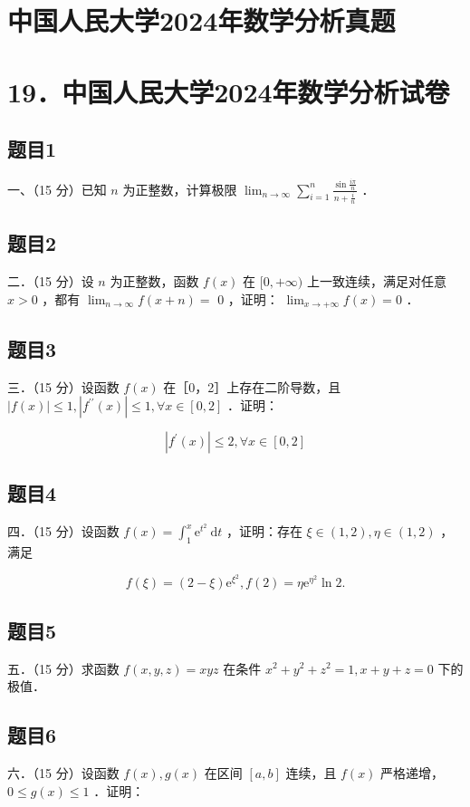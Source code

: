 \documentclass{article}
\begin{document}
\section*{中国人民大学2024年数学分析真题}
\section*{19．中国人民大学2024年数学分析试卷}

\subsection{题目1}
一、（15 分）已知 \(n\) 为正整数，计算极限 \(\lim _{n \rightarrow \infty} \sum_{i=1}^{n} \frac{\sin \frac{i \pi}{n}}{n+\frac{i}{n}}\) ．

\subsection{题目2}
二．（15 分）设 \(n\) 为正整数，函数 \(f(x)\) 在 \([0,+\infty)\) 上一致连续，满足对任意 \(x>0\) ，都有 \(\lim _{n \rightarrow \infty} f(x+n)=\) 0 ，证明： \(\lim _{x \rightarrow+\infty} f(x)=0\) ．

\subsection{题目3}
三．（15 分）设函数 \(f(x)\) 在［0，2］上存在二阶导数，且 \(|f(x)| \leq 1,\left|f^{\prime \prime}(x)\right| \leq 1, \forall x \in[0,2]\) ．证明：

\[
\left|f^{\prime}(x)\right| \leq 2, \forall x \in[0,2]
\]

\subsection{题目4}
四．（15 分）设函数 \(f(x)=\int_{1}^{x} \mathrm{e}^{t^{2}} \mathrm{~d} t\) ，证明：存在 \(\xi \in(1,2), \eta \in(1,2)\) ，满足

\[
f(\xi)=(2-\xi) \mathrm{e}^{\xi^{2}}, f(2)=\eta \mathrm{e}^{\eta^{2}} \ln 2 .
\]

\subsection{题目5}
五．（15 分）求函数 \(f(x, y, z)=x y z\) 在条件 \(x^{2}+y^{2}+z^{2}=1, x+y+z=0\) 下的极值．

\subsection{题目6}
六．（15 分）设函数 \(f(x), g(x)\) 在区间 \([a, b]\) 连续，且 \(f(x)\) 严格递增， \(0 \leq g(x) \leq 1\) ．证明：
\end{document}
